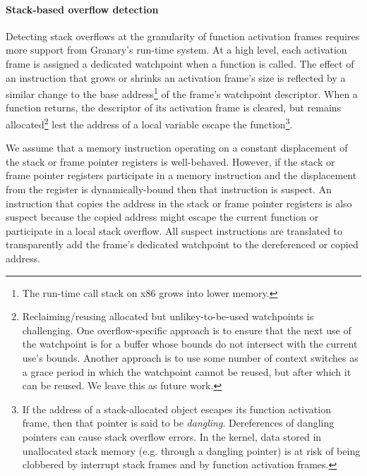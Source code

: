 \documentclass[letterpaper,twocolumn,10pt]{article}
\newcommand{\comment}[1]{}
\begin{document}
\paragraph{Stack-based overflow detection}
Detecting stack overflows at the granularity of function activation frames requires more support from Granary's run-time system. At a high level, each activation frame is assigned a dedicated watchpoint when a function is called. The effect of an instruction that grows or shrinks an activation frame's size is reflected by a similar change to the base address\footnote{The run-time call stack on x86 grows into lower memory.\comment{ Modifying the base address instead of the limit address allows us to maintain one set of vtable functions for all three buffer overflow detection policies.}} of the frame's watchpoint descriptor. When a function returns, the descriptor of its activation frame is cleared, but remains allocated\footnote{Reclaiming/reusing allocated but unlikey-to-be-used watchpoints is challenging. One overflow-specific approach is to ensure that the next use of the watchpoint is for a buffer whose bounds do not intersect with the current use's bounds. Another approach is to use some number of context switches as a grace period in which the watchpoint cannot be reused, but after which it can be reused. We leave this as future work.} lest the address of a local variable escape the function\footnote{If the address of a stack-allocated object escapes its function activation frame, then that pointer is said to be \emph{dangling}. Dereferences of dangling pointers can cause stack overflow errors. In the kernel, data stored in unallocated stack memory (e.g. through a dangling pointer) is at risk of being clobbered by interrupt stack frames and by function activation frames.}.  

We assume that a memory instruction operating on a constant displacement of the stack or frame pointer registers is well-behaved. However, if the stack or frame pointer registers participate in a memory instruction and the displacement from the register is dynamically-bound then that instruction is suspect. An instruction that copies the address in the stack or frame pointer registers is also suspect because the copied address might escape the current function or participate in a local stack overflow. All suspect instructions are translated to transparently add the frame's dedicated watchpoint to the dereferenced or copied address.

\end{document}
